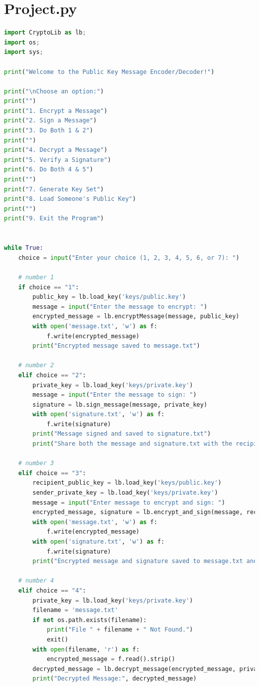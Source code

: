 \documentclass[12pt,a4paper]{report}
\begin{document}
\section{Project.py}
\begin{lstlisting}[language=Python]
import CryptoLib as lb;
import os;
import sys;

print("Welcome to the Public Key Message Encoder/Decoder!")

print("\nChoose an option:")
print("")
print("1. Encrypt a Message")
print("2. Sign a Message")
print("3. Do Both 1 & 2")
print("")
print("4. Decrypt a Message")
print("5. Verify a Signature")
print("6. Do Both 4 & 5")
print("")
print("7. Generate Key Set")
print("8. Load Someone's Public Key")
print("")
print("9. Exit the Program")


while True:
    choice = input("Enter your choice (1, 2, 3, 4, 5, 6, or 7): ")

    # number 1
    if choice == "1":
        public_key = lb.load_key('keys/public.key')
        message = input("Enter the message to encrypt: ")
        encrypted_message = lb.encryptMessage(message, public_key)
        with open('message.txt', 'w') as f:
            f.write(encrypted_message)
        print("Encrypted message saved to message.txt")

    # number 2
    elif choice == "2":
        private_key = lb.load_key('keys/private.key')
        message = input("Enter the message to sign: ")
        signature = lb.sign_message(message, private_key)
        with open('signature.txt', 'w') as f:
            f.write(signature)
        print("Message signed and saved to signature.txt")
        print("Share both the message and signature.txt with the recipient")

    # number 3
    elif choice == "3":
        recipient_public_key = lb.load_key('keys/public.key')
        sender_private_key = lb.load_key('keys/private.key')
        message = input("Enter message to encrypt and sign: ")
        encrypted_message, signature = lb.encrypt_and_sign(message, recipient_public_key, sender_private_key)
        with open('message.txt', 'w') as f:
            f.write(encrypted_message)
        with open('signature.txt', 'w') as f:
            f.write(signature)
        print("Encrypted message and signature saved to message.txt and signature.txt")

    # number 4
    elif choice == "4":
        private_key = lb.load_key('keys/private.key')
        filename = 'message.txt'
        if not os.path.exists(filename):
            print("File " + filename + " Not Found.")
            exit()
        with open(filename, 'r') as f:
            encrypted_message = f.read().strip()
        decrypted_message = lb.decrypt_message(encrypted_message, private_key)
        print("Decrypted Message:", decrypted_message)
        

\end{lstlisting}
\end{document}

